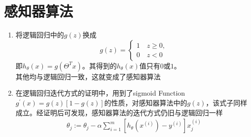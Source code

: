 \section{感知器算法}
\begin{enumerate}
	\item 将逻辑回归中的$g(z)$换成
	\[ g(z)=\begin{cases}
	1 \quad z \geq 0, \\
	0 \quad z <0
	\end{cases} \]
	即$h_\theta(x) = g(\Theta^Tx)$。其得到的$h_\theta(x)$值只有$0$或$1$。 \\
	其他均与逻辑回归一致，这就变成了感知器算法
	\item 在逻辑回归迭代方式的证明中，用到了sigmoid Function $g^{'}{(x)} = g(z)\left[1-g(z)\right]$的性质，对感知器算法中的$g(z)$，该式子同样成立。经证明后可发现，感知器算法的迭代方式仍旧与逻辑回归一样
	\begin{align}
		\theta_j :=  \theta_j - \alpha \sum_{i=1}^{m} \left[h_\theta(x^{(i)}) - y^{(i)} \right]x_j^{(i)}
	\end{align}
\end{enumerate}
















